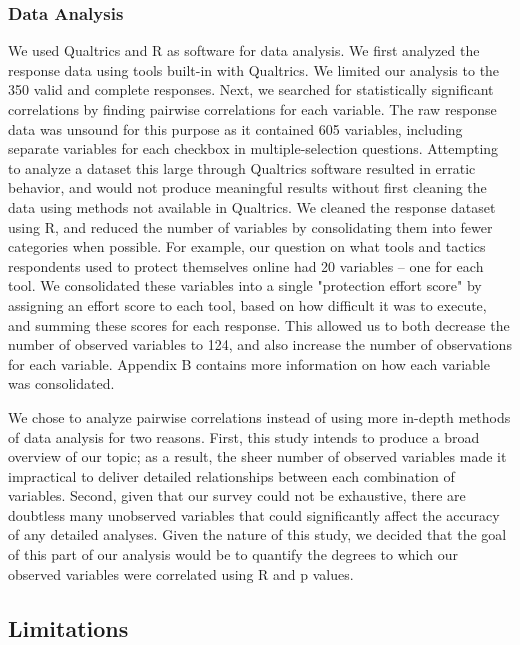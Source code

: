 \subsubsection{Data Analysis}

We used Qualtrics and R as software for data analysis. We first analyzed the response data using tools built-in with Qualtrics. We limited our analysis to the 350 valid and complete responses.
Next, we searched for statistically significant correlations by finding pairwise correlations for each variable. The raw response data was unsound for this purpose as it contained 605 variables, including separate variables for each checkbox in multiple-selection questions. Attempting to analyze a dataset this large through Qualtrics software resulted in erratic behavior, and would not produce meaningful results without first cleaning the data using methods not available in Qualtrics. We cleaned the response dataset using R, and reduced the number of variables by consolidating them into fewer categories when possible. For example, our question on what tools and tactics respondents used to protect themselves online had 20 variables -- one for each tool. We consolidated these variables into a single "protection effort score" by assigning an effort score to each tool, based on how difficult it was to execute, and summing these scores for each response. This allowed us to both decrease the number of observed variables to 124, and also increase the number of observations for each variable. Appendix B contains more information on how each variable was consolidated.

We chose to analyze pairwise correlations instead of using more in-depth methods of data analysis for two reasons. First, this study intends to produce a broad overview of our topic; as a result, the sheer number of observed variables made it impractical to deliver detailed relationships between each combination of variables. Second, given that our survey could not be exhaustive, there are doubtless many unobserved variables that could significantly affect the accuracy of any detailed analyses. Given the nature of this study, we decided that the goal of this part of our analysis would be to quantify the degrees to which our observed variables were correlated using R and p values.

\subsection{Limitations}

